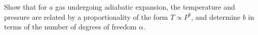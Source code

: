 Show that for a gas undergoing adiabatic expansion, the
temperature and pressure are related by a proportionality
of the form $T\propto P^b$, and determine $b$ in terms of
the number of degrees of freedom $\alpha$.\answercheck
